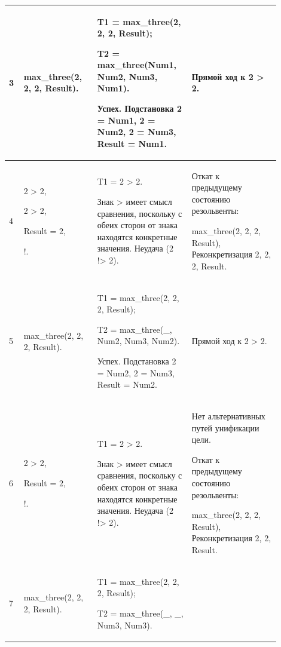 \documentclass[a4paper,12pt]{article}
\begin{document}
\begin{center}
\begin{longtable}[h!]{|p{0.05\linewidth}|p{0.25\linewidth}|p{ 0.3\linewidth}|p{ 0.3\linewidth}|}
			\hline
			
			{3} & {max\_three(2, 2, 2, Result).} & {T1 = max\_three(2, 2, 2, Result);
				
				
				
				T2 = max\_three(Num1, Num2, Num3, Num1).
				
				
				
				Успех. Подстановка 2 = Num1, 2 = Num2, 2 = Num3, Result = Num1.} & {Прямой ход к 2 > 2.}\\
			
			\hline
			
			{4} & {2 > 2,
				
				
				
				2 > 2,
				
				
				
				Result = 2,
				
				!.} & {T1 = 2 > 2.
				
				Знак > имеет смысл сравнения, поскольку с обеих сторон от знака находятся конкретные значения. Неудача (2 !> 2).} & {Откат к предыдущему состоянию резольвенты: 
				
				max\_three(2, 2, 2, Result), Реконкретизация 2, 2, 2, Result.}\\
			\hline
			{5} & {max\_three(2, 2, 2, Result).} & {T1 = max\_three(2, 2, 2, Result);
				
				T2 = max\_three(\_, Num2, Num3, Num2).
				
				Успех. Подстановка 2 = Num2, 2 = Num3, Result = Num2.} & {Прямой ход к 2 > 2.}\\
			\hline
			{6} & {2 > 2,
				
				Result = 2,
				
				!.} & {T1 = 2 > 2.
				
				Знак > имеет смысл сравнения, поскольку с обеих сторон от знака находятся конкретные значения. Неудача (2 !> 2).} & {Нет альтернативных путей унификации цели.
				
				Откат к предыдущему состоянию резольвенты: 
				
				max\_three(2, 2, 2, Result), Реконкретизация 2, 2, Result.}\\
			
			\hline
			
			{7} & {max\_three(2, 2, 2, Result).} & {T1 = max\_three(2, 2, 2, Result);
				
				
				
				T2 = max\_three(\_, \_, Num3, Num3).
				
				
				
}
\end{longtable}
\end{center}
\end{document}

